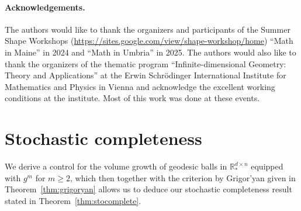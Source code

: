\documentclass[11pt]{article}
\newcommand{\R}{\mathbb{R}}
\begin{document}
\paragraph{Acknowledgements.}
The authors would like to thank the organizers and participants of the Summer Shape Workshops (\href{https://sites.google.com/view/shape-workshop/home}{https://sites.google.com/view/shape-workshop/home}) ``Math in Maine'' in 2024 and ``Math in Umbria'' in 2025. The authors would also like to thank the organizers of the thematic program ``Infinite-dimensional Geometry: Theory and Applications'' at the Erwin Schrödinger International Institute for Mathematics and Physics in Vienna and acknowledge the excellent working conditions at the institute. Most of this work was done at these events.

\section{Stochastic completeness}\label{sec:stocomplete}

We derive a control for the volume growth of geodesic balls in $\R_*^{d\times n}$ equipped with $g^m$ for $m\geq 2$, which then together with the criterion by Grigor'yan given in Theorem~\ref{thm:grigoryan} allows us to deduce our stochastic completeness result stated in Theorem~\ref{thm:stocomplete}.
\end{document}
